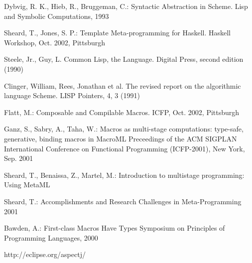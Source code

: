 \documentclass{llncs}
\begin{document}
%
%
\begin{thebibliography}{}
%
Dybvig, R. K., Hieb, R., Bruggeman, C.:
Syntactic Abstraction in Scheme.
Lisp and Symbolic Computations, 1993

Sheard, T., Jones, S. P.:
Template Meta-programming for Haskell.
Haskell Workshop, Oct. 2002, Pittsburgh

Steele, Jr., Guy, L.
Common Lisp, the Language.
Digital Press, second edition (1990)

Clinger, William, Rees, Jonathan et al.
The revised report on the algorithmic language Scheme.
LISP Pointers, 4, 3 (1991)

Flatt, M.:
Composable and Compilable Macros.
ICFP, Oct. 2002, Pittsburgh

Ganz, S., Sabry, A., Taha, W.:
Macros as multi-stage computations: type-safe, generative, binding macros in MacroML
Preceedings of the ACM SIGPLAN International Conference on Functional Programming (ICFP-2001),
New York, Sep. 2001

Sheard, T., Benaissa, Z., Martel, M.:
Introduction to multistage programming: Using MetaML

Sheard, T.:
Accomplishments and Research Challenges in Meta-Programming
2001

Bawden, A.:
First-class Macros Have Types
Symposium on Principles of Programming Languages, 2000

http://eclipse.org/aspectj/

\end{thebibliography}
\end{document}
